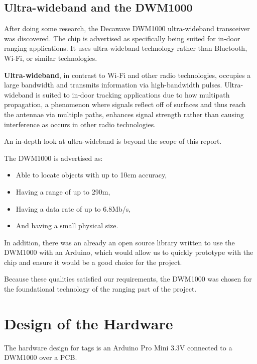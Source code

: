 \subsection{Ultra-wideband and the DWM1000}
After doing some research, the Decawave DWM1000 ultra-wideband transceiver was discovered. The chip is advertised as specifically being suited for in-door ranging applications. It uses ultra-wideband technology rather than Bluetooth, Wi-Fi, or similar technologies.

\textbf{Ultra-wideband}, in contrast to Wi-Fi and other radio technologies, occupies a large bandwidth and transmits information via high-bandwidth pulses. Ultra-wideband is suited to in-door tracking applications due to how multipath propagation, a phenomenon where signals reflect off of surfaces and thus reach the antennae via multiple paths, enhances signal strength rather than causing interference as occurs in other radio technologies. 

An in-depth look at ultra-wideband is beyond the scope of this report.

The DWM1000 is advertised as:
\begin{itemize}
	\item Able to locate objects with up to 10cm accuracy,
	\item Having a range of up to 290m,
	\item Having a data rate of up to 6.8Mb/s,
	\item And having a small physical size. 
\end{itemize}

In addition, there was an already an open source library written to use the DWM1000 with an Arduino, which would allow us to quickly prototype with the chip and ensure it would be a good choice for the project.

Because these qualities satisfied our requirements, the DWM1000 was chosen for the foundational technology of the ranging part of the project. 

\section{Design of the Hardware}
The hardware design for tags is an Arduino Pro Mini 3.3V connected to a DWM1000 over a PCB. 

